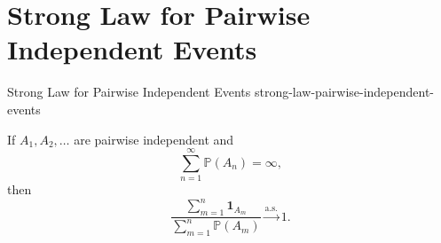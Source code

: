 \section{Strong Law for Pairwise Independent Events}

\begin{theorem}
{Strong Law for Pairwise Independent Events}
{strong-law-pairwise-independent-events}

If $A_1,A_2,\ldots$ are pairwise independent and
\[
    \sum_{n=1}^{\infty}\mathbb P(A_n)=\infty,
\]
then
\[
    \boxed{
    \frac{\displaystyle\sum_{m=1}^{n}\mathbf{1}_{A_m}}
         {\displaystyle\sum_{m=1}^{n}\mathbb P(A_m)}
    \xrightarrow{\mathrm{a.s.}}1.
    }
\]

\end{theorem}


